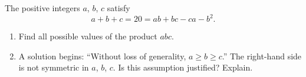 The positive integers $a$, $b$, $c$ satisfy
\[a+b+c=20=ab+bc-ca-b^2.\]
\begin{enumerate}
\item[(a)] Find all possible values of the product $abc$.
\item[(b)] A solution begins: ``Without loss of generality, $a\ge b\ge c$.'' The right-hand side is not symmetric in $a$, $b$, $c$. Is this assumption justified? Explain.
\end{enumerate}
